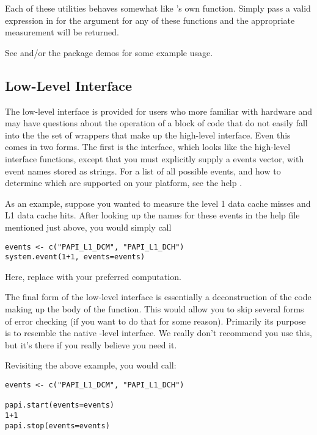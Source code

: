 Each of these utilities behaves somewhat like \R's own  
function.  Simply pass a valid \R expression in for the  argument 
for any of these functions and the appropriate measurement will be returned.

See  and/or the package demos for some example usage.


\subsection{Low-Level Interface}

The low-level interface is provided for users who more familiar with hardware and may have 
questions about the operation of a block of code that do not easily fall into the the set of 
wrappers that make up the high-level interface.  Even this comes in two forms.  The first is the 
 interface, which looks like the high-level interface functions, except that 
you must explicitly supply a \PAPI events vector, with event names stored as strings.  For a list 
of all possible events, and how to determine which are supported on your platform, see the \R help 
.

As an example, suppose you wanted to measure the level 1 data cache misses and L1 data cache hits. 
After looking up the names for these events in the help file mentioned just above, you would simply 
call
\begin{lstlisting}[language=rr]
events <- c("PAPI_L1_DCM", "PAPI_L1_DCH")
system.event(1+1, events=events)
\end{lstlisting}

Here, replace  with your preferred computation.

The final form of the low-level interface is essentially a deconstruction of the code making up the 
body of the  function.  This would allow you to skip several forms of error 
checking (if you want to do that for some reason).  Primarily its purpose is to resemble the 
native \C-level \PAPI interface.  We really don't recommend you use this, but it's there if you 
really believe you need it.

Revisiting the above example, you would call:
\begin{lstlisting}[language=rr]
events <- c("PAPI_L1_DCM", "PAPI_L1_DCH")

papi.start(events=events)
1+1
papi.stop(events=events)
\end{lstlisting}


\
